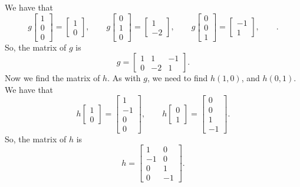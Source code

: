 \begin{enumerate}[a)]
We have that
$$
g\left[\begin{array}{c}1\\0\\0\end{array}\right]=\left[\begin{array}{c}1\\0\end{array}\right],\qquad
g\left[\begin{array}{c}0\\1\\0\end{array}\right]=\left[\begin{array}{c}1\\-2\end{array}\right],\qquad
g\left[\begin{array}{c}0\\0\\1\end{array}\right]=\left[\begin{array}{c}-1\\1\end{array}\right],\qquad.
$$
So, the matrix of $g$ is
$$g = \left[\begin{array}{ccc}1&1&-1\\0&-2&1\end{array}\right].$$
Now we find the matrix of $h$. As with $g$, we need to find $h(1,0)$, and $h(0,1)$. We have that
$$
h\left[\begin{array}{c}1\\0\end{array}\right]=\left[\begin{array}{c}1\\-1\\0\\0\end{array}\right],\qquad h\left[\begin{array}{c}0\\1\end{array}\right]=\left[\begin{array}{c}0\\0\\1\\-1\end{array}\right].
$$
So, the matrix of $h$ is
$$h = \left[\begin{array}{cc}1&0\\-1&0\\0&1\\0&-1\end{array}\right].$$

\end{enumerate}
